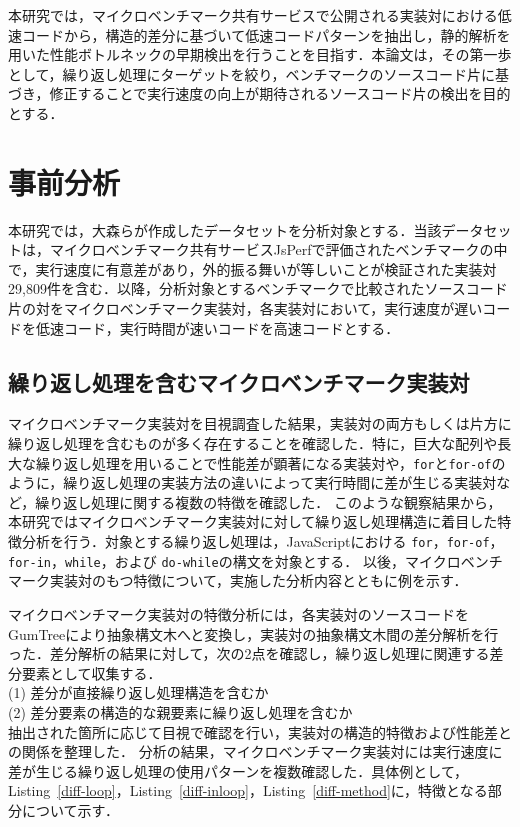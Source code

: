\documentclass[submit,techrep,noauthor]{ipsj}
\newcommand{\todo}[1]{\colorbox{yellow}{{\bf TODO}:}{\color{red} {\textbf{[#1]}}}}
\begin{document}
本研究では，マイクロベンチマーク共有サービスで公開される実装対における低速コードから，構造的差分に基づいて低速コードパターンを抽出し，静的解析を用いた性能ボトルネックの早期検出を行うことを目指す．本論文は，その第一歩として，繰り返し処理にターゲットを絞り，ベンチマークのソースコード片に基づき，修正することで実行速度の向上が期待されるソースコード片の検出を目的とする．



\section{事前分析}
\label{sec:pre-analysis}


本研究では，大森ら\cite{omori}が作成したデータセットを分析対象とする．当該データセットは，マイクロベンチマーク共有サービスJsPerfで評価されたベンチマークの中で，実行速度に有意差があり，外的振る舞いが等しいことが検証された実装対29,809件を含む．以降，分析対象とするベンチマークで比較されたソースコード片の対をマイクロベンチマーク実装対，各実装対において，実行速度が遅いコードを低速コード，実行時間が速いコードを高速コードとする．

\subsection{繰り返し処理を含むマイクロベンチマーク実装対}
\label{section3.1}


マイクロベンチマーク実装対を目視調査した結果，実装対の両方もしくは片方に繰り返し処理を含むものが多く存在することを確認した．特に，巨大な配列や長大な繰り返し処理を用いることで性能差が顕著になる実装対や，\texttt{for}と\texttt{for-of}のように，繰り返し処理の実装方法の違いによって実行時間に差が生じる実装対など，繰り返し処理に関する複数の特徴を確認した．
このような観察結果から，本研究ではマイクロベンチマーク実装対に対して繰り返し処理構造に着目した特徴分析を行う．対象とする繰り返し処理は，JavaScriptにおける \texttt{for}，\texttt{for-of}，\texttt{for-in}，\texttt{while}，および \texttt{do-while}の構文を対象とする．
以後，マイクロベンチマーク実装対のもつ特徴について，実施した分析内容とともに例を示す．

マイクロベンチマーク実装対の特徴分析には，各実装対のソースコードをGumTree\cite{gumtree}により抽象構文木へと変換し，実装対の抽象構文木間の差分解析を行った．差分解析の結果に対して，次の2点を確認し，繰り返し処理に関連する差分要素として収集する．\\
\noindent(1) 差分が直接繰り返し処理構造を含むか\\
\noindent(2) 差分要素の構造的な親要素に繰り返し処理を含むか\\
抽出された箇所に応じて目視で確認を行い，実装対の構造的特徴および性能差との関係を整理した．
分析の結果，マイクロベンチマーク実装対には実行速度に差が生じる繰り返し処理の使用パターンを複数確認した．具体例として，Listing~\ref{diff-loop}，Listing~\ref{diff-inloop}，Listing~\ref{diff-method}に，特徴となる部分について示す．
\end{document}
